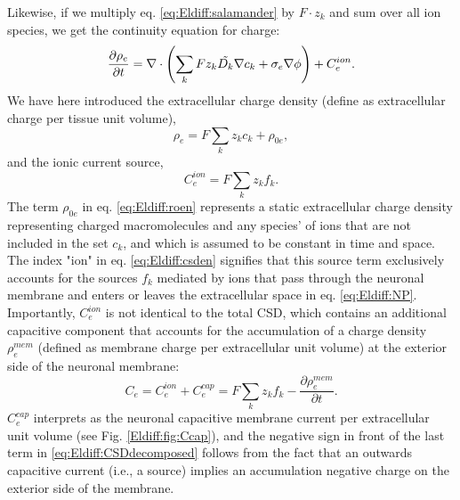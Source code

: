 Likewise, if we multiply eq. \ref{eq:Eldiff:salamander} by $F\cdot z_k$ and sum over all ion species, we get the continuity equation for charge: 
\begin{equation}
\frac{\partial \rho_e}{\partial t} =  \nabla \cdot \left (\sum_k{F z_k \tilde{D_k}{\bf \nabla} c_{k}} + \sigma_e\nabla\phi  \right)  + C_e^{ion}.
\label{eq:Eldiff:chargecontinuity}
\end{equation}
We have here introduced the extracellular charge density (define as extracellular charge per tissue unit volume), 
\begin{equation}
\rho_e = F \sum_k z_k c_k + \rho_{0e},  
\label{eq:Eldiff:roen}
\end{equation}
and the ionic current source, 
\begin{equation}
C_e^{ion} = F \sum_k z_k f_k. 
\label{eq:Eldiff:csden}
\end{equation}
The term $\rho_{0e}$ in eq. \ref{eq:Eldiff:roen} represents a static extracellular charge density representing charged macromolecules and any species' of ions that are not included in the set $c_k$, and which is assumed to be constant in time and space. The index "ion" in eq. \ref{eq:Eldiff:csden} signifies that this source term exclusively accounts for the sources $f_k$ mediated by ions that pass through the neuronal membrane and enters or leaves the extracellular space in eq. \ref{eq:Eldiff:NP}. Importantly, $C_e^{ion}$ is not identical to the total CSD, which contains an additional capacitive component that accounts for the accumulation of a charge density $\rho_e^{mem}$ (defined as membrane charge per extracellular unit volume) at the exterior side of the neuronal membrane:
\begin{equation}
C_e = C_e^{ion} + C_e^{cap} = F \sum_k z_k f_k - \frac{\partial \rho_{e}^{mem}}{\partial t}.
\label{eq:Eldiff:CSDdecomposed}
\end{equation}
$C_e^{cap}$ interprets as the neuronal capacitive membrane current per extracellular unit volume (see Fig. \ref{Eldiff:fig:Ccap}), and the negative sign in front of the last term in \ref{eq:Eldiff:CSDdecomposed} follows from the fact that an outwards capacitive current (i.e., a source) implies an accumulation negative charge on the exterior side of the membrane. 

